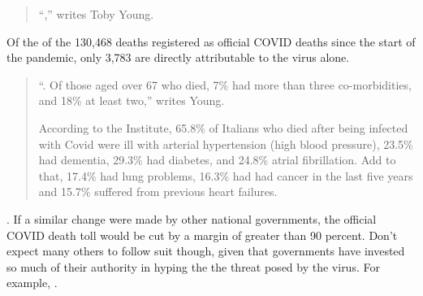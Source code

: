 \begin{refsection}
\begin{tcolorbox}[quote]
\begin{quote}
\enquote{,} writes\textsuperscript{\cite{urld6b0b18e}} Toby Young.

\end{quote}

Of the of the 130,468 deaths registered as official COVID deaths since the start of the pandemic, only 3,783 are directly attributable to the virus alone.

\begin{quote}

\enquote{. Of those aged over 67 who died, 7\% had more than three co-morbidities, and 18\% at least two,} writes Young.

According to the Institute, 65.8\% of Italians who died after being infected with Covid were ill with arterial hypertension (high blood pressure), 23.5\% had dementia, 29.3\% had diabetes, and 24.8\% atrial fibrillation. Add to that, 17.4\% had lung problems, 16.3\% had had cancer in the last five years and 15.7\% suffered from previous heart failures.

\end{quote}

. If a similar change were made by other national governments, the official COVID death toll would be cut by a margin of greater than 90 percent. Don't expect many others to follow suit though, given that governments have invested so much of their authority in hyping the the threat posed by the virus. For example, .\textsuperscript{\cite{url2309o8ih}}

\end{tcolorbox}

\printbibliography[heading=subbibliography]

\end{refsection}